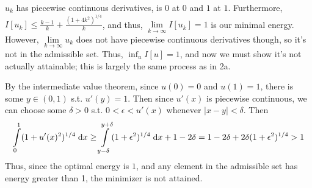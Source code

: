 \begin{enumerate}
  $u_k$ has piecewise continuous derivatives, is $0$ at $0$ and $1$ at $1$.
  Furthermore, $I[u_k] \leq \frac{k - 1}{k} + \frac{(1 + 4 k^2)^{1/4}}{k}$,
  and thus, $\lim \limits_{k \rightarrow \infty} I[u_k] = 1$ is our minimal energy.
  However, $\lim \limits_{k \rightarrow \infty} u_k$ does not have piecewise continuous derivatives though, so it's not in the admissible set.
  Thus, $\inf_{u} I[u] = 1$, and now we must show it's not actually attainable; this is largely the same process as in 2a.

  By the intermediate value theorem, since $u(0) = 0$ and $u(1) = 1$, there is some $y \in (0, 1)$ s.t. $u'(y) = 1$.
  Then since $u'(x)$ is piecewise continuous, we can choose some $\delta > 0$ s.t. $0 < \epsilon < u'(x)$ whenever $|x - y| < \delta$.
  Then
  $$
  \int \limits_{0}^{1} (1 + u'(x)^2)^{1/4} \;\mathrm{d}x \geq \int \limits_{y - \delta}^{y + \delta} (1 + \epsilon^2)^{1/4} \;\mathrm{d}x + 1 - 2 \delta
  = 1 - 2 \delta + 2 \delta (1 + \epsilon^2)^{1/4} > 1
  $$
  Thus, since the optimal energy is $1$, and any element in the admissible set has energy greater than 1, the minimizer is not attained.
\end{enumerate}
